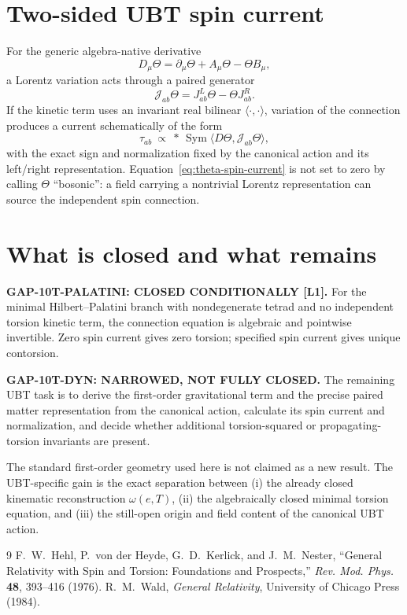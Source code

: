 \documentclass[12pt,a4paper]{article}
\theoremstyle{remark}\newtheorem{remark}[definition]{Remark}
\begin{document}
\section{Two-sided UBT spin current}
For the generic algebra-native derivative
\begin{equation}
 D_\mu\Theta=\partial_\mu\Theta+A_\mu\Theta-\Theta B_\mu,
\end{equation}
a Lorentz variation acts through a paired generator
\begin{equation}
 \mathcal J_{ab}\Theta
 =J^{L}_{ab}\Theta-\Theta J^{R}_{ab}.
\end{equation}
If the kinetic term uses an invariant real bilinear
$\langle\cdot,\cdot\rangle$, variation of the connection produces a current
schematically of the form
\begin{equation}
 \tau_{ab}\ \propto\
 *\,\operatorname{Sym}\langle D\Theta,\mathcal J_{ab}\Theta\rangle,
 \label{eq:theta-spin-current}
\end{equation}
with the exact sign and normalization fixed by the canonical action and its
left/right representation.  Equation~\eqref{eq:theta-spin-current} is not set
to zero by calling $\Theta$ ``bosonic'': a field carrying a nontrivial Lorentz
representation can source the independent spin connection.

\section{What is closed and what remains}
\begin{tcolorbox}[colback=green!6!white,colframe=green!55!black,title=Defensible status]
\textbf{GAP-10T-PALATINI: CLOSED CONDITIONALLY [L1].}
For the minimal Hilbert--Palatini branch with nondegenerate tetrad and no
independent torsion kinetic term, the connection equation is algebraic and
pointwise invertible.  Zero spin current gives zero torsion; specified spin
current gives unique contorsion.

\medskip
\textbf{GAP-10T-DYN: NARROWED, NOT FULLY CLOSED.}
The remaining UBT task is to derive the first-order gravitational term and the
precise paired matter representation from the canonical action, calculate its
spin current and normalization, and decide whether additional torsion-squared
or propagating-torsion invariants are present.
\end{tcolorbox}

The standard first-order geometry used here is not claimed as a new result.
The UBT-specific gain is the exact separation between (i) the already closed
kinematic reconstruction $\omega(e,T)$, (ii) the algebraically closed minimal
torsion equation, and (iii) the still-open origin and field content of the
canonical UBT action.

\begin{thebibliography}{9}
 F.~W.~Hehl, P.~von der Heyde, G.~D.~Kerlick, and J.~M.~Nester,
``General Relativity with Spin and Torsion: Foundations and Prospects,''
\emph{Rev. Mod. Phys.} \textbf{48}, 393--416 (1976).
 R.~M.~Wald, \emph{General Relativity}, University of Chicago Press (1984).
\end{thebibliography}
\end{document}
